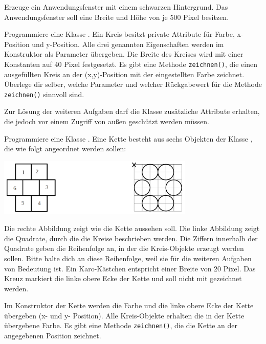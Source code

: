 \begin{compactenum}[a)]
\item Erzeuge ein Anwendungsfenster mit einem schwarzen Hintergrund. Das
Anwendungsfenster soll eine Breite und Höhe von je 500 Pixel besitzen.

\item Programmiere eine Klasse . Ein Kreis besitzt private
Attribute für Farbe, x-Position und y-Position. Alle drei genannten Eigenschaften werden im
Konstruktor als Parameter übergeben. Die Breite des Kreises wird mit einer
Konstanten auf 40 Pixel festgesetzt. Es gibt eine Methode \verb|zeichnen()|, die
einen ausgefüllten Kreis an der (x,y)-Position mit der eingestellten Farbe
zeichnet. Überlege dir selber, welche Parameter und welcher Rückgabewert für
die Methode \verb|zeichnen()| sinnvoll sind.

Zur Lösung der weiteren Aufgaben darf die Klasse  zusätzliche
Attribute erhalten, die jedoch vor einem Zugriff von außen geschützt werden müssen.

\item Programmiere eine Klasse . Eine Kette besteht aus sechs
Objekten der Klasse , die wie folgt angeordnet werden sollen:

\begin{center}
\includegraphics[width=0.7\textwidth]{./inf/SEKII/17_Java_Wiederholung/Aufgabe1.png}
\end{center}

Die rechte Abbildung zeigt wie die Kette aussehen soll. Die linke
Abbildung zeigt die Quadrate, durch die die Kreise beschrieben werden. Die
Ziffern innerhalb der Quadrate geben die Reihenfolge an, in der die
Kreis-Objekte erzeugt werden sollen. Bitte halte dich an diese Reihenfolge,
weil sie für die weiteren Aufgaben von Bedeutung ist. Ein Karo-Kästchen
entspricht einer Breite von 20 Pixel. Das Kreuz markiert die linke obere Ecke
der Kette und soll nicht mit gezeichnet werden.

Im Konstruktor der Kette werden die Farbe und die linke obere Ecke der Kette
übergeben (x- und y- Position). Alle Kreis-Objekte erhalten die in der Kette
übergebene Farbe. Es gibt eine Methode \verb|zeichnen()|, die die Kette an der
angegebenen Position zeichnet.


\end{compactenum}
